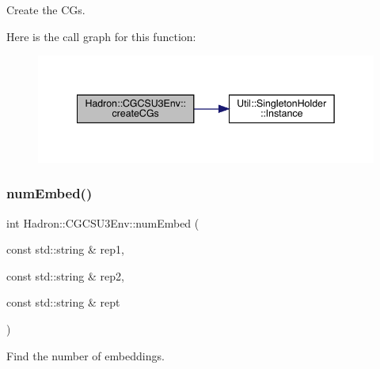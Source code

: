 Create the C\+Gs. 

Here is the call graph for this function\+:
\nopagebreak
\begin{figure}[H]
\begin{center}
\leavevmode
\includegraphics[width=342pt]{d4/d47/namespaceHadron_1_1CGCSU3Env_aa351bf5350216c70336911a96182d035_cgraph}
\end{center}
\end{figure}
\mbox{\label{namespaceHadron_1_1CGCSU3Env_acc35e8f63cd5a1ffe14a963df3f2c1fd}} 
\subsubsection{\texorpdfstring{numEmbed()}{numEmbed()}}
{\footnotesize\ttfamily int Hadron\+::\+C\+G\+C\+S\+U3\+Env\+::num\+Embed (\begin{DoxyParamCaption}\item[{const std\+::string \&}]{rep1,  }\item[{const std\+::string \&}]{rep2,  }\item[{const std\+::string \&}]{rept }\end{DoxyParamCaption})}



Find the number of embeddings. 

